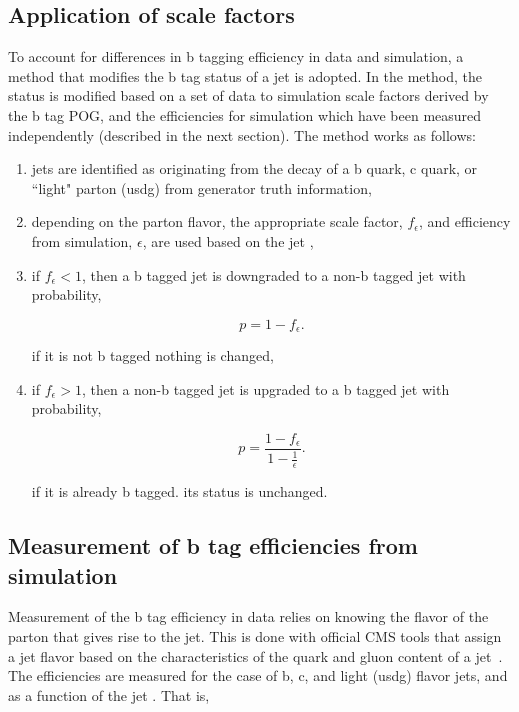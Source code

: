 \subsection{Application of scale factors}

To account for differences in b tagging efficiency in data and
simulation, a method that modifies the b tag status of a jet is adopted.
In the method, the status is modified based on a set of data to
simulation scale factors derived by the b tag POG, and the efficiencies
for simulation which have been measured independently (described in the
next section).  The method works as follows:

\begin{enumerate}
    \item jets are identified as originating from the decay of a b
    quark, c quark, or ``light" parton (usdg) from generator truth information,
    \item depending on the parton flavor, the appropriate scale factor,
    $f_{\epsilon}$, and efficiency from simulation, $\epsilon$, are used
    based on the jet \pt,
    \item if $f_{\epsilon} < 1$, then a b tagged jet is downgraded to a
    non-b tagged jet with probability,

    \begin{equation}
        p = 1 - f_{\epsilon}.
    \end{equation}

    if it is not b tagged nothing is changed,
    \item if $f_{\epsilon} > 1$, then a non-b tagged jet is upgraded to
    a b tagged jet with probability,

    \begin{equation}
        p = \frac{1 - f_{\epsilon}}{1 - \frac{1}{\epsilon}}.
    \end{equation}

    if it is already b tagged. its status is unchanged.
\end{enumerate}

\subsection{Measurement of b tag efficiencies from simulation}

Measurement of the b tag efficiency in data relies on knowing the flavor
of the parton that gives rise to the jet.  This is done with official
CMS tools that assign a jet flavor based on the characteristics of the
quark and gluon content of a jet~\cite{twiki:jet_mc_flavor}.  The
efficiencies are measured for the case of b, c, and light (usdg) flavor
jets, and as a function of the jet \pt.  That is,

